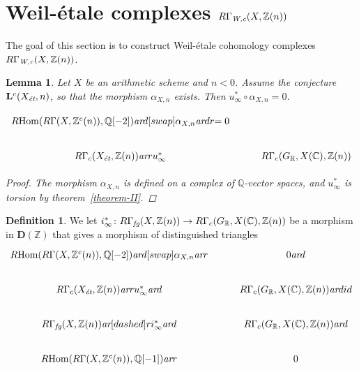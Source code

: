 \documentclass[leqno,12pt]{article}
\theoremstyle{plain}
\newtheorem{lemma}[theorem]{\indent\sc Lemma}
\theoremstyle{definition}
\newtheorem{definition}[theorem]{\indent\sc Definition}
\DeclareMathOperator{\Hom}{Hom}
\newcommand{\CC}{\mathbb{C}}
\newcommand{\QQ}{\mathbb{Q}}
\newcommand{\RR}{\mathbb{R}}
\newcommand{\ZZ}{\mathbb{Z}}
\newcommand{\Wc}{\text{\it W,c}}
\newcommand{\ar}{\text{\it ar}}
\newcommand{\et}{\text{\it \'{e}t}}
\newcommand{\fg}{\text{\it fg}}
\newcommand{\RHom}{R\!\Hom}
\begin{document}

\section{Weil-\'{e}tale complexes $R\Gamma_\Wc (X, \ZZ(n))$}
\label{sec:RGamma-Wc}

The goal of this section is to construct Weil-\'{e}tale cohomology complexes
$R\Gamma_\Wc (X, \ZZ(n))$.

\begin{lemma}
  Let $X$ be an arithmetic scheme and $n < 0$. Assume the conjecture
  $\mathbf{L}^c (X_\et, n)$, so that the morphism $\alpha_{X,n}$ exists.
  Then $u_\infty^* \circ \alpha_{X,n} = 0$.

  \[ \begin{tikzcd}
    \RHom (R\Gamma (X, \ZZ^c (n)), \QQ [-2]) \ar{d}[swap]{\alpha_{X,n}}\ar{dr}{= 0} \\
      R\Gamma_c (X_\et, \ZZ (n)) \ar{r}{u_\infty^*} & R\Gamma_c (G_\RR, X (\CC), \ZZ (n))
    \end{tikzcd} \]

  \begin{proof}
    The morphism $\alpha_{X,n}$ is defined on a complex of $\QQ$-vector spaces,
    and $u_\infty^*$ is torsion by theorem~\ref{theorem-II}.
  \end{proof}
\end{lemma}

\begin{definition}
  \label{dfn:i-infty}
  We let
  $i_\infty^*\colon R\Gamma_\fg (X, \ZZ (n)) \to R\Gamma_c (G_\RR, X (\CC), \ZZ (n))$
  be a morphism in $\mathbf{D} (\ZZ)$ that gives a morphism of distinguished
  triangles
  \begin{equation}
    \label{eqn:triangle-defining-i-infty}
    \begin{tikzcd}
      \RHom (R\Gamma (X, \ZZ^c (n)), \QQ [-2]) \ar{d}[swap]{\alpha_{X,n}}\ar{r} & 0\ar{d} \\
      R\Gamma_c (X_\et, \ZZ (n)) \ar{r}{u_\infty^*}\ar{d} &  R\Gamma_c (G_\RR, X (\CC), \ZZ (n)) \ar{d}{id} \\
      R\Gamma_\fg (X, \ZZ (n)) \ar[dashed]{r}{i_\infty^*}\ar{d} & R\Gamma_c (G_\RR, X (\CC), \ZZ (n)) \ar{d} \\
      \RHom (R\Gamma (X, \ZZ^c (n)), \QQ [-1])\ar{r} & 0 \\
    \end{tikzcd}
  \end{equation}
\end{definition}
\end{document}
